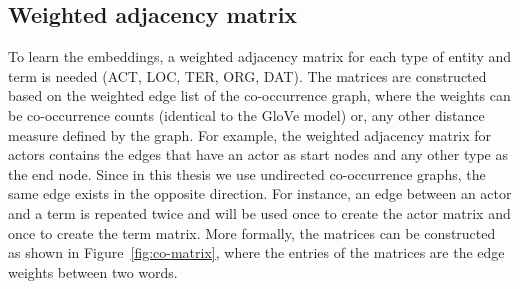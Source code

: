 \subsection{Weighted adjacency matrix}\label{sec:adj_matrix}
To learn the embeddings, a weighted adjacency matrix for each type of entity and term is needed (ACT, LOC, TER, ORG, DAT). The matrices are constructed based on the weighted edge list of the co-occurrence graph, where the weights can be co-occurrence counts (identical to the GloVe model) or, any other distance measure defined by the graph. For example, the weighted adjacency matrix for actors contains the edges that have an actor as start nodes and any other type as the end node. Since in this thesis we use undirected co-occurrence graphs, the same edge exists in the opposite direction. For instance, an edge between an actor and a term is repeated twice and will be used once to create the actor matrix and once to create the term matrix. More formally, the matrices can be constructed as shown in Figure~\ref{fig:co-matrix}, where the entries of the matrices are the edge weights between two words.  
